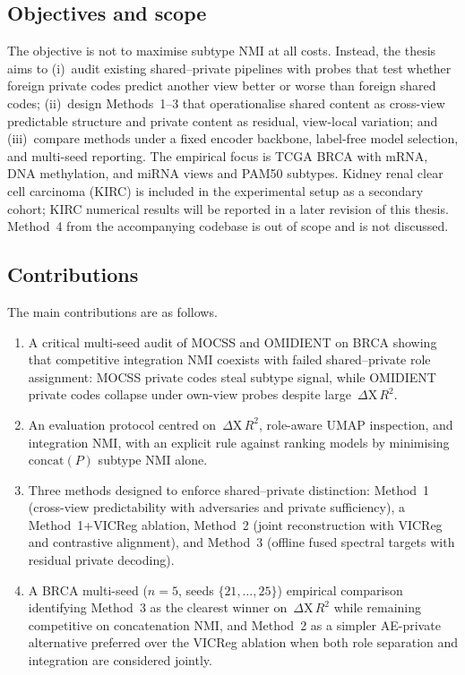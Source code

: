 \subsection{Objectives and scope}

The objective is not to maximise subtype NMI at all costs. Instead, the thesis aims to (i)~audit existing shared--private pipelines with probes that test whether foreign private codes predict another view better or worse than foreign shared codes; (ii)~design Methods~1--3 that operationalise shared content as cross-view predictable structure and private content as residual, view-local variation; and (iii)~compare methods under a fixed encoder backbone, label-free model selection, and multi-seed reporting. The empirical focus is TCGA BRCA with mRNA, DNA methylation, and miRNA views and PAM50 subtypes. Kidney renal clear cell carcinoma (KIRC) is included in the experimental setup as a secondary cohort; KIRC numerical results will be reported in a later revision of this thesis. Method~4 from the accompanying codebase is out of scope and is not discussed.

\subsection{Contributions}

The main contributions are as follows.

\begin{enumerate}
\item A critical multi-seed audit of MOCSS and OMIDIENT on BRCA showing that competitive integration NMI coexists with failed shared--private role assignment: MOCSS private codes steal subtype signal, while OMIDIENT private codes collapse under own-view probes despite large~$\Delta\mathrm{X}\,R^{2}$.
\item An evaluation protocol centred on~$\Delta\mathrm{X}\,R^{2}$, role-aware UMAP inspection, and integration NMI, with an explicit rule against ranking models by minimising $\mathrm{concat}(P)$ subtype NMI alone.
\item Three methods designed to enforce shared--private distinction: Method~1 (cross-view predictability with adversaries and private sufficiency), a Method~1+VICReg ablation, Method~2 (joint reconstruction with VICReg and contrastive alignment), and Method~3 (offline fused spectral targets with residual private decoding).
\item A BRCA multi-seed ($n=5$, seeds $\{21,\ldots,25\}$) empirical comparison identifying Method~3 as the clearest winner on~$\Delta\mathrm{X}\,R^{2}$ while remaining competitive on concatenation NMI, and Method~2 as a simpler AE-private alternative preferred over the VICReg ablation when both role separation and integration are considered jointly.
\end{enumerate}

